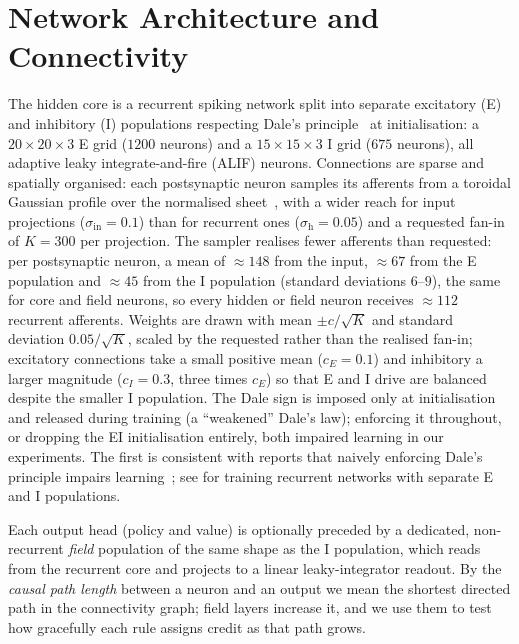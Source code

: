 \documentclass[10pt,twocolumn]{article}
\begin{document}
\section{Network Architecture and Connectivity}
\label{app:arch}
The hidden core is a recurrent spiking network split into separate excitatory
(E) and inhibitory (I) populations respecting Dale's
principle~\citep{dale1935pharmacology,vanVreeswijk1996Chaos} at initialisation:
a $20\times20\times3$ E grid ($1200$ neurons) and a $15\times15\times3$ I grid
($675$ neurons), all adaptive leaky integrate-and-fire (ALIF) neurons.
Connections are sparse and spatially organised: each postsynaptic neuron samples
its afferents from a toroidal Gaussian profile over the normalised
sheet~\citep{Spreizer2019Toroidal}, with a wider reach for input projections
($\sigma_{\mathrm{in}}=0.1$) than for recurrent ones ($\sigma_{\mathrm{h}}=0.05$)
and a requested fan-in of $K=300$ per projection. The sampler realises fewer
afferents than requested: per postsynaptic neuron, a mean of $\approx148$ from the
input, $\approx67$ from the E population and $\approx45$ from the I population
(standard deviations $6$--$9$), the same for core and field neurons, so every
hidden or field neuron receives $\approx112$ recurrent afferents. Weights are drawn
with mean $\pm c/\sqrt{K}$ and standard deviation $0.05/\sqrt{K}$, scaled by the
requested rather than the realised fan-in;
excitatory connections take a small positive mean ($c_E=0.1$) and inhibitory a
larger magnitude ($c_I=0.3$, three times $c_E$) so that E and I drive are balanced
despite the smaller I population. The Dale sign is imposed only at initialisation and
released during training (a ``weakened'' Dale's law); enforcing it throughout,
or dropping the EI initialisation entirely, both impaired learning in our
experiments. The first is consistent with reports that naively enforcing
Dale's principle impairs learning~\citep{Cornford2021DaleANN}; see
\citet{Song2016DaleEI} for training recurrent networks with separate E and I
populations.

Each output head (policy and value) is optionally preceded by a dedicated,
non-recurrent \emph{field} population of the same shape as the I population,
which reads from the recurrent core and projects to a linear leaky-integrator
readout. By the \emph{causal path length} between a neuron and an output we mean
the shortest directed path in the connectivity graph; field layers increase it,
and we use them to test how gracefully each rule assigns credit as that path
grows.
\end{document}
